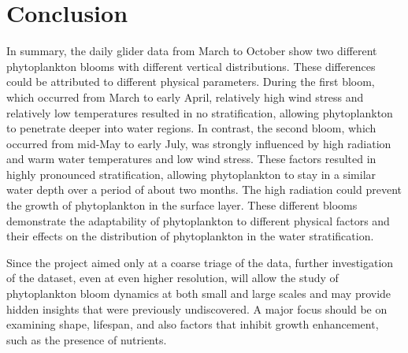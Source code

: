 \documentclass[../Main.tex]{subfiles}
\begin{document}
\section*{\crule[blue]{.3cm}{.3cm} Conclusion}
In summary, the daily glider data from March to October show two different phytoplankton blooms with different vertical distributions. These differences could be attributed to different physical parameters.
During the first bloom, which occurred from March to early April, relatively high wind stress and relatively low temperatures resulted in no stratification, allowing phytoplankton to penetrate deeper into water regions.
In contrast, the second bloom, which occurred from mid-May to early July, was strongly influenced by high radiation and warm water temperatures and low wind stress. These factors resulted in highly pronounced stratification, allowing phytoplankton to stay in a similar water depth over a period of about two months. The high radiation could prevent the growth of phytoplankton in the surface layer.
These different blooms demonstrate the adaptability of phytoplankton to different physical factors and their effects on the distribution of phytoplankton in the water stratification.

Since the project aimed only at a coarse triage of the data, further investigation of the dataset, even at even higher resolution, will allow the study of phytoplankton bloom dynamics at both small and large scales and may provide hidden insights that were previously undiscovered.
A major focus should be on examining shape, lifespan, and also factors that inhibit growth enhancement, such as the presence of nutrients.
\end{document}
